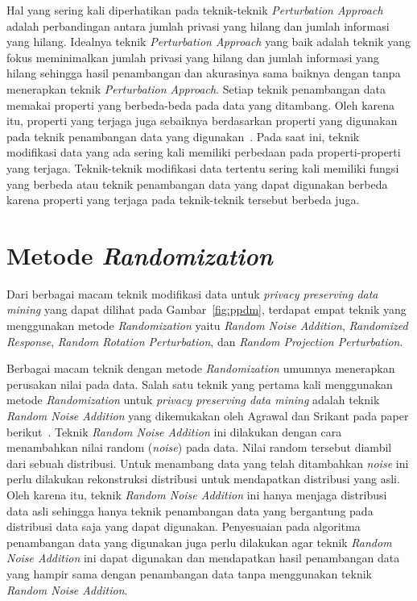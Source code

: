 Hal yang sering kali diperhatikan pada teknik-teknik \textit{Perturbation Approach} adalah perbandingan antara jumlah privasi yang hilang dan jumlah informasi yang hilang. Idealnya teknik \textit{Perturbation Approach} yang baik adalah teknik yang fokus meminimalkan jumlah privasi yang hilang dan jumlah informasi yang hilang sehingga hasil penambangan dan akurasinya sama baiknya dengan tanpa menerapkan teknik \textit{Perturbation Approach}. Setiap teknik penambangan data memakai properti yang berbeda-beda pada data yang ditambang. Oleh karena itu, properti yang terjaga juga sebaiknya berdasarkan properti yang digunakan pada teknik penambangan data yang digunakan~\cite{rotation:05:chenliu}. Pada saat ini, teknik modifikasi data yang ada sering kali memiliki perbedaan pada properti-properti yang terjaga. Teknik-teknik modifikasi data tertentu sering kali memiliki fungsi yang berbeda atau teknik penambangan data yang dapat digunakan berbeda karena properti yang terjaga pada teknik-teknik tersebut berbeda juga.

\section{Metode \textit{Randomization}}
\label{sec:metoderandomization}

Dari berbagai macam teknik modifikasi data untuk \textit{privacy preserving data mining} yang dapat dilihat pada Gambar~\ref{fig:ppdm}, terdapat empat teknik yang menggunakan metode \textit{Randomization} yaitu \textit{Random Noise Addition}, \textit{Randomized Response}, \textit{Random Rotation Perturbation}, dan \textit{Random Projection Perturbation}.

Berbagai macam teknik dengan metode \textit{Randomization} umumnya menerapkan perusakan nilai pada data. Salah satu teknik yang pertama kali menggunakan metode \textit{Randomization} untuk \textit{privacy preserving data mining} adalah teknik \textit{Random Noise Addition} yang dikemukakan oleh Agrawal dan Srikant pada paper berikut~\cite{agrawalsrikant:00:randomnoise}. Teknik \textit{Random Noise Addition} ini dilakukan dengan cara menambahkan nilai random (\textit{noise}) pada data. Nilai random tersebut diambil dari sebuah distribusi. Untuk menambang data yang telah ditambahkan \textit{noise} ini perlu dilakukan rekonstruksi distribusi untuk mendapatkan distribusi yang asli. Oleh karena itu, teknik \textit{Random Noise Addition} ini hanya menjaga distribusi data asli sehingga hanya teknik penambangan data yang bergantung pada distribusi data saja yang dapat digunakan. Penyesuaian pada algoritma penambangan data yang digunakan juga perlu dilakukan agar teknik \textit{Random Noise Addition} ini dapat digunakan dan mendapatkan hasil penambangan data yang hampir sama dengan penambangan data tanpa menggunakan teknik \textit{Random Noise Addition}.

